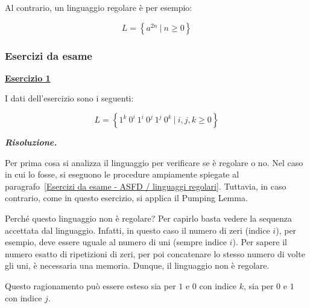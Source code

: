 \documentclass[a4paper]{article}
\begin{document}
	\noindent
	Al contrario, un linguaggio regolare è per esempio:
	
	\begin{equation*}
		L = \left\{a^{2n} \: \left| \: n \ge 0 \right.\right\}
	\end{equation*}

	\newpage
	
	\subsubsection[\textcolor{Red3}{Esercizi da esame}]{Esercizi da esame}
	
	\textcolor{Red3}{\textbf{\underline{Esercizio 1}}}\newline
	
	\noindent
	I dati dell'esercizio sono i seguenti:
	
	\begin{equation*}
		L = \left\{1^{k} \: 0^{i} \: 1^{i} \: 0^{j} \: 1^{j} \: 0^{k} \: \left| \: i,j,k \ge 0 \right.\right\}
	\end{equation*}\newline
	
	\noindent
	\textcolor{Green4}{\textbf{\emph{Risoluzione.}}}\newline
	
	\noindent
	Per prima cosa si analizza il linguaggio per verificare se è regolare o no. Nel caso in cui lo fosse, si eseguono le procedure ampiamente spiegate al paragrafo~\ref{Esercizi da esame - ASFD / linguaggi regolari}. Tuttavia, in caso contrario, come in questo esercizio, si applica il Pumping Lemma.
	
	Perché questo linguaggio non è regolare? Per capirlo basta vedere la sequenza accettata dal linguaggio. Infatti, in questo caso il numero di zeri (indice $i$), per esempio, deve essere uguale al numero di uni (sempre indice $i$). Per sapere il numero esatto di ripetizioni di zeri, per poi concatenare lo stesso numero di volte gli uni, è necessaria una memoria. Dunque, il linguaggio non è regolare.
	
	Questo ragionamento può essere esteso sia per $1$ e $0$ con indice $k$, sia per $0$ e $1$ con indice $j$.
	
\end{document}
